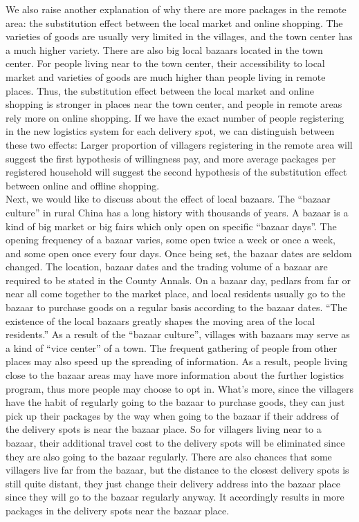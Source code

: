 \documentclass{article}
\begin{document}
\mbox{\hspace{2em}}
We also raise another explanation of why there are more packages in the remote area: the substitution effect between the local market and online shopping. The varieties of goods are usually very limited in the villages, and the town center has a much higher variety. There are also big local bazaars located in the town center. For people living near to the town center, their accessibility to local market and varieties of goods are much higher than people living in remote places. Thus, the substitution effect between the local market and online shopping is stronger in places near the town center, and people in remote areas rely more on online shopping. If we have the exact number of people registering in the new logistics system for each delivery spot, we can distinguish between these two effects: Larger proportion of villagers registering in the remote area will suggest the first hypothesis of willingness pay, and more average packages per registered household will suggest the second hypothesis of the substitution effect between online and offline shopping.\\
\mbox{\hspace{2em}}
Next, we would like to discuss about the effect of local bazaars. The “bazaar culture” in rural China has a long history with thousands of years. A bazaar is a kind of big market or big fairs which only open on specific “bazaar days”. The opening frequency of a bazaar varies, some open twice a week or once a week, and some open once every four days. Once being set, the bazaar dates are seldom changed. The location, bazaar dates and the trading volume of a bazaar are required to be stated in the County Annals. On a bazaar day, pedlars from far or near all come together to the market place, and local residents usually go to the bazaar to purchase goods on a regular basis according to the bazaar dates. “The existence of the local bazaars greatly shapes the moving area of the local residents.”  As a result of the “bazaar culture”, villages with bazaars may serve as a kind of “vice center” of a town. The frequent gathering of people from other places may also speed up the spreading of information. As a result, people living close to the bazaar areas may have more information about the further logistics program, thus more people may choose to opt in. What’s more, since the villagers have the habit of regularly going to the bazaar to purchase goods, they can just pick up their packages by the way when going to the bazaar if their address of the delivery spots is near the bazaar place. So for villagers living near to a bazaar, their additional travel cost to the delivery spots will be eliminated since they are also going to the bazaar regularly. There are also chances that some villagers live far from the bazaar, but the distance to the closest delivery spots is still quite distant, they just change their delivery address into the bazaar place since they will go to the bazaar regularly anyway. It accordingly results in more packages in the delivery spots near the bazaar place.\\
\end{document}
